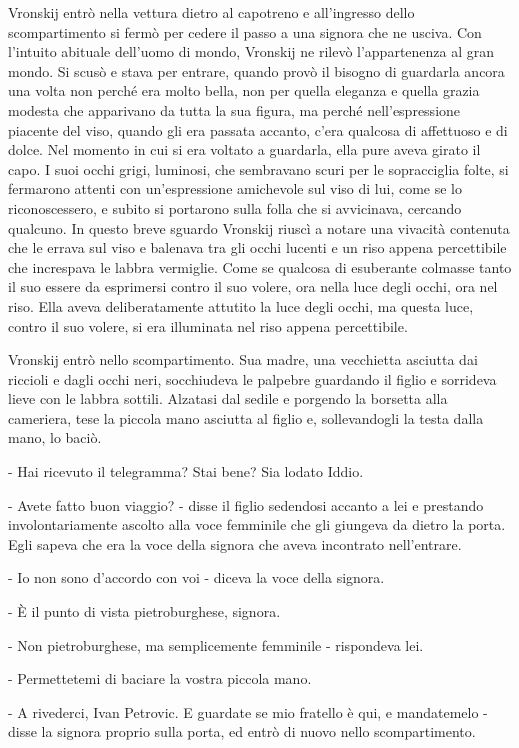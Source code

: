 Vronskij entrò nella vettura dietro al capotreno e all'ingresso dello scompartimento si fermò per cedere il passo a una signora che ne usciva. Con l'intuito abituale dell'uomo di mondo, Vronskij ne rilevò l'appartenenza al gran mondo. Si scusò e stava per entrare, quando provò il bisogno di guardarla ancora una volta non perché era molto bella, non per quella eleganza e quella grazia modesta che apparivano da tutta la sua figura, ma perché nell'espressione piacente del viso, quando gli era passata accanto, c'era qualcosa di affettuoso e di dolce. Nel momento in cui si era voltato a guardarla, ella pure aveva girato il capo. I suoi occhi grigi, luminosi, che sembravano scuri per le sopracciglia folte, si fermarono attenti con un'espressione amichevole sul viso di lui, come se lo riconoscessero, e subito si portarono sulla folla che si avvicinava, cercando qualcuno. In questo breve sguardo Vronskij riuscì a notare una vivacità contenuta che le errava sul viso e balenava tra gli occhi lucenti e un riso appena percettibile che increspava le labbra vermiglie. Come se qualcosa di esuberante colmasse tanto il suo essere da esprimersi contro il suo volere, ora nella luce degli occhi, ora nel riso. Ella aveva deliberatamente attutito la luce degli occhi, ma questa luce, contro il suo volere, si era illuminata nel riso appena percettibile. 

Vronskij entrò nello scompartimento. Sua madre, una vecchietta asciutta dai riccioli e dagli occhi neri, socchiudeva le palpebre guardando il figlio e sorrideva lieve con le labbra sottili. Alzatasi dal sedile e porgendo la borsetta alla cameriera, tese la piccola mano asciutta al figlio e, sollevandogli la testa dalla mano, lo baciò. 

- Hai ricevuto il telegramma? Stai bene? Sia lodato Iddio. 

- Avete fatto buon viaggio? - disse il figlio sedendosi accanto a lei e prestando involontariamente ascolto alla voce femminile che gli giungeva da dietro la porta. Egli sapeva che era la voce della signora che aveva incontrato nell'entrare. 

- Io non sono d'accordo con voi - diceva la voce della signora. 

- È il punto di vista pietroburghese, signora. 

- Non pietroburghese, ma semplicemente femminile - rispondeva lei. 

- Permettetemi di baciare la vostra piccola mano. 

- A rivederci, Ivan Petrovic. E guardate se mio fratello è qui, e mandatemelo - disse la signora proprio sulla porta, ed entrò di nuovo nello scompartimento. 

